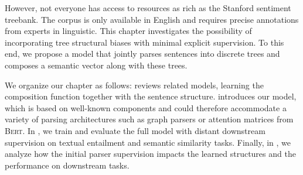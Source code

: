 However, not everyone has access to resources as rich as the Stanford sentiment treebank. The corpus is only available in English and requires precise annotations from experts in linguistic. This chapter investigates the possibility of incorporating tree structural biases with minimal explicit supervision. To this end, we propose a model that jointly parses sentences into discrete trees and composes a semantic vector along with these trees.

We organize our chapter as follows:  reviews related models, learning the composition function together with the sentence structure.  introduces our model, which is based on well-known components and could therefore accommodate a variety of parsing architectures such as graph parsers or attention matrices from \textsc{Bert}. In , we train and evaluate the full model with distant downstream supervision on textual entailment and semantic similarity tasks. Finally, in , we analyze how the initial parser supervision impacts the learned structures and the performance on downstream tasks.









